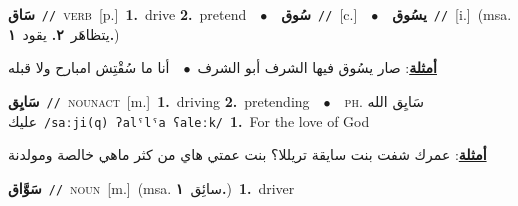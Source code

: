 \documentclass[10pt,a4paper,twoside]{article} %
\begin{document}
\begin{multicols}{2}
{\setlength\topsep{0pt}\textbf{\foreignlanguage{arabic}{سَاق}}\ {\color{gray}\texttt{//}\color{black}}\ \textsc{verb}\ [p.]\ \textbf{1.}~drive  \textbf{2.}~pretend\ \ $\bullet$\ \ \setlength\topsep{0pt}\textbf{\foreignlanguage{arabic}{سُوق}}\ {\color{gray}\texttt{//}\color{black}}\ [c.]\ \ $\bullet$\ \ \setlength\topsep{0pt}\textbf{\foreignlanguage{arabic}{يسُوق}}\ {\color{gray}\texttt{//}\color{black}}\ [i.]\ \color{gray}(msa. \foreignlanguage{arabic}{يتظاهَر}~\foreignlanguage{arabic}{\textbf{٢.}}  \foreignlanguage{arabic}{يقود}~\foreignlanguage{arabic}{\textbf{١.}})\color{black}\  \begin{flushright}\color{gray}\foreignlanguage{arabic}{\textbf{\underline{\foreignlanguage{arabic}{أمثلة}}}: صار يسُوق فيها الشرف أبو الشرف\ $\bullet$\ \  أنا ما سُقْتِش امبارح ولا قبله}\end{flushright}\color{black}} \vspace{2mm}

{\setlength\topsep{0pt}\textbf{\foreignlanguage{arabic}{سَايِق}}\ {\color{gray}\texttt{//}\color{black}}\ \textsc{noun\textunderscore act}\ [m.]\ \textbf{1.}~driving  \textbf{2.}~pretending\ \ $\bullet$\ \ \textsc{ph.} \color{gray} \foreignlanguage{arabic}{سَايِق الله عليك}\color{black}\ {\color{gray}\texttt{/{\sffamily saːji(q) ʔalˤlˤa ʕaleːk}/}\color{black}}\ \textbf{1.}~For the love of God\  \begin{flushright}\color{gray}\foreignlanguage{arabic}{\textbf{\underline{\foreignlanguage{arabic}{أمثلة}}}: عمرك شفت بنت سايقة تريللا؟ بنت عمتي هاي من كثر ماهي خالصة ومولدنة}\end{flushright}\color{black}} \vspace{2mm}

{\setlength\topsep{0pt}\textbf{\foreignlanguage{arabic}{سَوَّاق}}\ {\color{gray}\texttt{//}\color{black}}\ \textsc{noun}\ [m.]\ \color{gray}(msa. \foreignlanguage{arabic}{سائِق}~\foreignlanguage{arabic}{\textbf{١.}})\color{black}\ \textbf{1.}~driver\ } \vspace{2mm}


\end{multicols}
\end{document}
